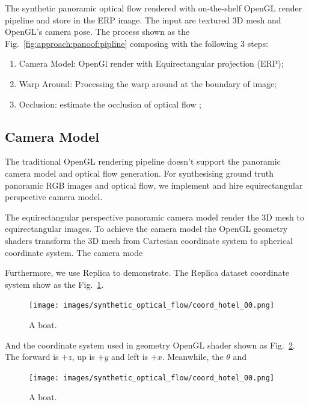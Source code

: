 The synthetic panoramic optical flow rendered with on-the-shelf OpenGL render pipeline and store in the ERP image.
The input are textured 3D mesh and OpenGL's camera pose.
The process shown as the Fig.~\ref{fig:approach:panoof:pipline} composing with the following 3 steps:

\begin{enumerate}
	\item Camera Model: OpenGl render with Equirectangular projection (ERP);
	\item Warp Around: Processing the warp around at the boundary of image;
	\item Occlusion: estimate the occlusion of optical flow ;
\end{enumerate}

\subsection{Camera Model}

The traditional OpenGL rendering pipeline doesn't support the panoramic camera model and optical flow generation.
For synthesising ground truth panoramic RGB images and optical flow, we implement and hire equirectangular perspective camera model.

The equirectangular perspective panoramic camera model render the 3D mesh to  equirectangular images.
To achieve the camera model the OpenGL geometry shaders transform the 3D mesh from Cartesian coordinate system to spherical coordinate system. 
The camera mode

Furthermore, we use Replica to demonstrate. 
The Replica dataset coordinate system show as the Fig.~\ref{fig:approach:coord_hotel_00}.

\begin{figure}[hbt!]
	\centering
	\texttt{[image: images/synthetic\_optical\_flow/coord\_hotel\_00.png]}
	\caption{A boat.}
	\label{fig:approach:coord_hotel_00}
\end{figure}

And the coordinate system used in geometry OpenGL shader shown as Fig.~\ref{fig:approach:geometry_cs}.
The forward is $+z$, up is $+y$ and left is $+x$.
Meanwhile, the $\theta$ and 

\begin{figure}[hbt!]
	\centering
	\texttt{[image: images/synthetic\_optical\_flow/coord\_hotel\_00.png]}
	\caption{A boat.}
	\label{fig:approach:geometry_cs}
\end{figure}


